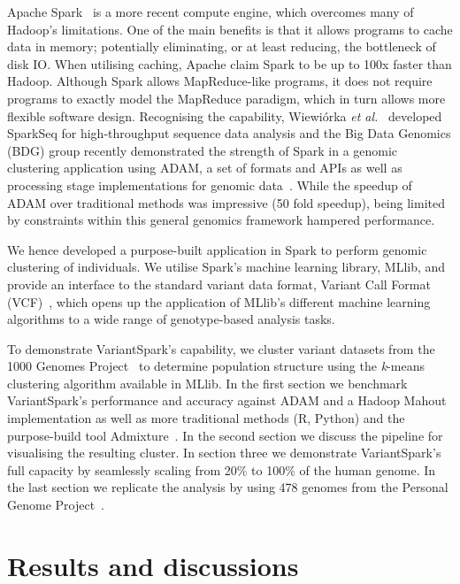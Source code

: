 \documentclass{bmcart}
\newcommand{\variantSpark}{{\sc VariantSpark}}
\newcommand{\kMeans}{\textit{k}-means}
\begin{document}
{\sc Apache Spark}~\cite{Zaharia2011} is a more recent compute engine, which overcomes many of Hadoop's limitations. 
One of the main benefits is that it allows programs to cache data in memory; potentially eliminating, or at least reducing, the bottleneck of disk IO. 
When utilising caching, Apache claim {\sc Spark} to be up to 100x faster than Hadoop. 
Although {\sc Spark} allows MapReduce-like programs, it does not require programs to exactly model the MapReduce paradigm, which in turn allows more flexible software design. 
Recognising the capability, Wiewi{\'o}rka {\it et al.}~\cite{Wiewiorka2014} developed {\sc SparkSeq} for high-throughput sequence data analysis and the Big Data Genomics (BDG) group recently demonstrated the strength of {\sc Spark} in a genomic clustering application using {\sc ADAM}, a set of formats and APIs as well as processing stage implementations for genomic data~\cite{Massie2013}. 
While the speedup of {\sc ADAM} over traditional methods was impressive (50 fold speedup), being limited by constraints within this general genomics framework hampered performance. 

We hence developed a purpose-built application in {\sc Spark} to perform genomic clustering of individuals. 
We utilise {\sc Spark}'s machine learning library, \mbox{MLlib}, and provide an interface to the standard variant data format, Variant Call Format (VCF)~\cite{1KG2012}, which opens up the application of MLlib's different machine learning algorithms to a wide range of genotype-based analysis tasks. 

To demonstrate \variantSpark's capability, we cluster variant datasets from the 1000 Genomes Project~\cite{1KG2012} to determine population structure using the \kMeans{} clustering algorithm available in MLlib. 
In the first section we benchmark \variantSpark's performance and accuracy against {\sc ADAM} and a Hadoop Mahout implementation as well as more traditional methods (R, Python) and the purpose-build tool {\sc Admixture}~\cite{Alexander2009}. %
In the second section we discuss the pipeline for visualising the resulting cluster.
In section three we demonstrate \variantSpark's full capacity by seamlessly scaling from 20\% to 100\% of the human genome.
In the last section we replicate the analysis by using 478 genomes from the Personal Genome Project~\cite{Lunshof2013}.


\section*{Results and discussions}
\end{document}
